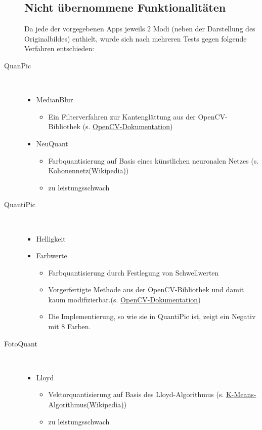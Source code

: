 \begin{description}
\subsection{Nicht übernommene Funktionalitäten}

Da jede der vorgegebenen Apps jeweils 2 Modi (neben der Darstellung des Originalbildes) enthielt, wurde sich nach mehreren Tests gegen folgende Verfahren entschieden:

\item[QuanPic]~\par
\begin{itemize}
\item MedianBlur 
	\begin{itemize}
	\item Ein Filterverfahren zur Kantenglättung aus der OpenCV-Bibliothek (s. \href{http://docs.opencv.org/2.4/doc/tutorials/imgproc/gausian_median_blur_bilateral_filter/gausian_median_blur_bilateral_filter.html}{OpenCV-Dokumentation})
	\end{itemize}
\item NeuQuant 
	\begin{itemize}
	\item Farbquantisierung auf Basis eines künstlichen neuronalen Netzes (s. \href{https://de.wikipedia.org/wiki/Selbstorganisierende_Karte}{Kohonennetz(Wikipedia)}) 
	\item zu leistungsschwach
	\end{itemize}
\end{itemize}

\item[QuantiPic]~\par
\begin{itemize}
\item Helligkeit
\item Farbwerte
	\begin{itemize}
	\item Farbquantisierung durch Festlegung von Schwellwerten 
	\item Vorgerfertigte Methode aus der OpenCV-Bibliothek und damit kaum modifizierbar.(s. \href{http://docs.opencv.org/2.4/doc/tutorials/imgproc/gausian_median_blur_bilateral_filter/gausian_median_blur_bilateral_filter.html}{OpenCV-Dokumentation})
	\item Die Implementierung, so wie sie in QuantiPic ist, zeigt ein Negativ mit 8 Farben. 
\end{itemize}
\end{itemize}

\item[FotoQuant]~\par
\begin{itemize}
\item Lloyd
	\begin{itemize}
	\item Vektorquantisierung auf Basis des Lloyd-Algorithmus (s. \href{https://de.wikipedia.org/wiki/K-Means-Algorithmus}{K-Means-Algorithmus(Wikipedia)})
	\item zu leistungsschwach
\end{itemize}
\end{itemize}



\end{description}
